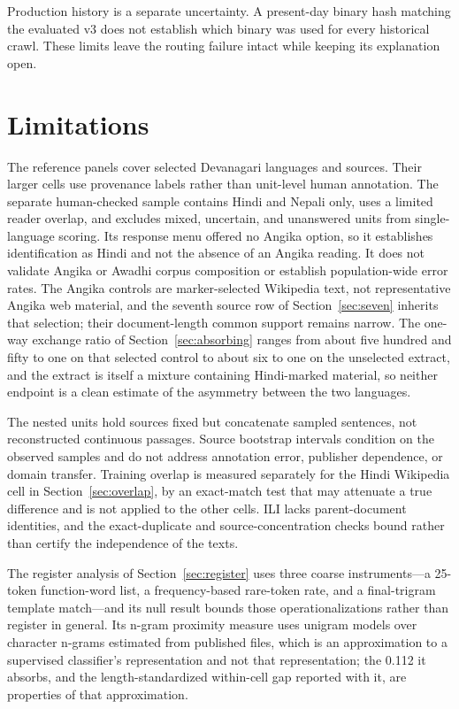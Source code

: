 \documentclass[final]{clv2025}
\begin{document}
Production history is a separate uncertainty. A present-day binary hash matching the evaluated v3 does not establish which binary was used for every historical crawl. These limits leave the routing failure intact while keeping its explanation open.

\section{Limitations}

The reference panels cover selected Devanagari languages and sources. Their larger cells use provenance labels rather than unit-level human annotation. The separate human-checked sample contains Hindi and Nepali only, uses a limited reader overlap, and excludes mixed, uncertain, and unanswered units from single-language scoring. Its response menu offered no Angika option, so it establishes identification as Hindi and not the absence of an Angika reading. It does not validate Angika or Awadhi corpus composition or establish population-wide error rates. The Angika controls are marker-selected Wikipedia text, not representative Angika web material, and the seventh source row of Section~\ref{sec:seven} inherits that selection; their document-length common support remains narrow. The one-way exchange ratio of Section~\ref{sec:absorbing} ranges from about five hundred and fifty to one on that selected control to about six to one on the unselected extract, and the extract is itself a mixture containing Hindi-marked material, so neither endpoint is a clean estimate of the asymmetry between the two languages.

The nested units hold sources fixed but concatenate sampled sentences, not reconstructed continuous passages. Source bootstrap intervals condition on the observed samples and do not address annotation error, publisher dependence, or domain transfer. Training overlap is measured separately for the Hindi Wikipedia cell in Section~\ref{sec:overlap}, by an exact-match test that may attenuate a true difference and is not applied to the other cells. ILI lacks parent-document identities, and the exact-duplicate and source-concentration checks bound rather than certify the independence of the texts.

The register analysis of Section~\ref{sec:register} uses three coarse instruments---a 25-token function-word list, a frequency-based rare-token rate, and a final-trigram template match---and its null result bounds those operationalizations rather than register in general. Its n-gram proximity measure uses unigram models over character n-grams estimated from published files, which is an approximation to a supervised classifier's representation and not that representation; the 0.112 it absorbs, and the length-standardized within-cell gap reported with it, are properties of that approximation.
\end{document}
